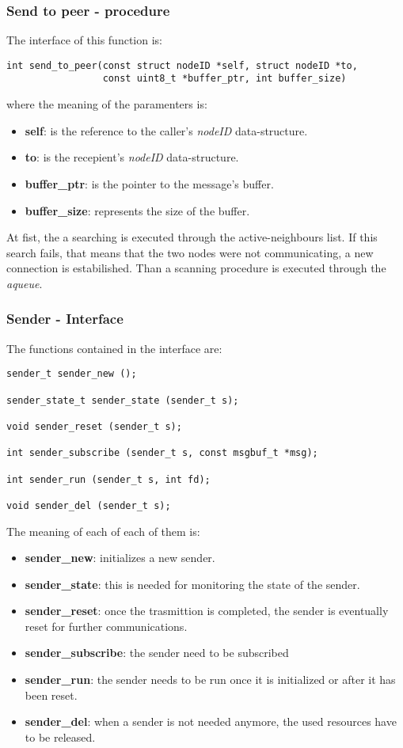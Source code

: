 \subsubsection{Send to peer - procedure}
The interface of this function is:
\begin{lstlisting}
int send_to_peer(const struct nodeID *self, struct nodeID *to,
                 const uint8_t *buffer_ptr, int buffer_size)
\end{lstlisting}
where the meaning of the paramenters is:
\begin{itemize}
  \item \textbf{self}: is the reference to the caller's \textit{nodeID} data-structure.
  \item \textbf{to}: is the recepient's \textit{nodeID} data-structure.
  \item \textbf{buffer\_ptr}: is the pointer to the message's buffer.
  \item \textbf{buffer\_size}: represents the size of the buffer.
\end{itemize}
At fist, the a searching is executed through the active-neighbours list. If this search fails, that means that
the two nodes were not communicating, a new connection is estabilished. Than a scanning procedure is executed
through the \textit{aqueue}.

\subsubsection{Sender - Interface}
The functions contained in the interface are:
\begin{lstlisting}
sender_t sender_new ();

sender_state_t sender_state (sender_t s);

void sender_reset (sender_t s);

int sender_subscribe (sender_t s, const msgbuf_t *msg);

int sender_run (sender_t s, int fd);

void sender_del (sender_t s);
\end{lstlisting}

The meaning of each of each of them is:
\begin{itemize}
  \item \textbf{sender\_new}: initializes a new sender.
  \item \textbf{sender\_state}: this is needed for monitoring the state of the sender.
  \item \textbf{sender\_reset}: once the trasmittion is completed, the sender is eventually reset for
                                further communications.
  \item \textbf{sender\_subscribe}: the sender need to be subscribed
  \item \textbf{sender\_run}: the sender needs to be run once it is initialized or after it has been reset.
  \item \textbf{sender\_del}: when a sender is not needed anymore, the used resources have to be released.
\end{itemize}

